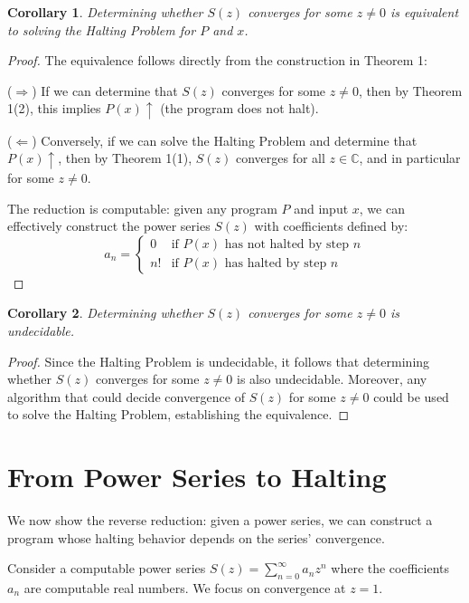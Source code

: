 \documentclass[12pt, a4paper]{article}
\newtheorem{corollary}{Corollary}
\begin{document}
\begin{corollary}
Determining whether $S(z)$ converges for some $z \neq 0$ is equivalent to solving the Halting Problem for $P$ and $x$.
\end{corollary}
\begin{proof}
The equivalence follows directly from the construction in Theorem 1:

($\Rightarrow$) If we can determine that $S(z)$ converges for some $z \neq 0$, then by Theorem 1(2), this implies $P(x) \uparrow$ (the program does not halt).

($\Leftarrow$) Conversely, if we can solve the Halting Problem and determine that $P(x) \uparrow$, then by Theorem 1(1), $S(z)$ converges for all $z \in \mathbb{C}$, and in particular for some $z \neq 0$.

The reduction is computable: given any program $P$ and input $x$, we can effectively construct the power series $S(z)$ with coefficients defined by:
\[
a_n = 
\begin{cases}
0 & \text{if } P(x) \text{ has not halted by step } n \\
n! & \text{if } P(x) \text{ has halted by step } n
\end{cases}
\]
\end{proof}

\begin{corollary}
Determining whether $S(z)$ converges for some $z \neq 0$ is undecidable. 
\end{corollary}
\begin{proof}
Since the Halting Problem is undecidable, it follows that determining whether $S(z)$ converges for some $z \neq 0$ is also undecidable. Moreover, any algorithm that could decide convergence of $S(z)$ for some $z \neq 0$ could be used to solve the Halting Problem, establishing the equivalence.
\end{proof}

\section{From Power Series to Halting}

We now show the reverse reduction: given a power series, we can construct a program whose halting behavior depends on the series' convergence. 

Consider a computable power series $S(z) = \sum_{n=0}^{\infty} a_n z^n$ where the coefficients $a_n$ are computable real numbers. We focus on convergence at $z = 1$.
\end{document}

